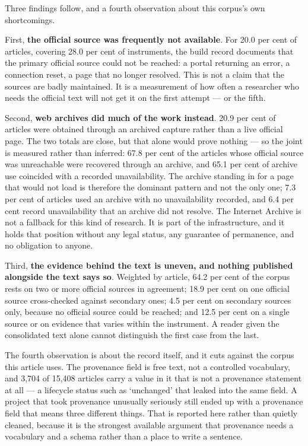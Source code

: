 \documentclass[11pt]{article}
\begin{document}
Three findings follow, and a fourth observation about this corpus's own
shortcomings.

First, \textbf{the official source was frequently not available}. For 20.0 per
cent of articles, covering 28.0 per cent of instruments, the build record
documents that the primary official source could not be reached: a portal
returning an error, a connection reset, a page that no longer resolved. This
is not a claim that the sources are badly maintained. It is a measurement of
how often a researcher who needs the official text will not get it on the
first attempt --- or the fifth.

Second, \textbf{web archives did much of the work instead}. 20.9 per cent of
articles were obtained through an archived capture rather than a live official
page. The two totals are close, but that alone would prove nothing --- so the
joint is measured rather than inferred: 67.8 per cent of the articles whose
official source was unreachable were recovered through an archive, and 65.1 per
cent of archive use coincided with a recorded unavailability. The archive
standing in for a page that would not load is therefore the dominant pattern
and not the only one; 7.3 per cent of articles used an archive with no
unavailability recorded, and 6.4 per cent record unavailability that an archive
did not resolve. The Internet Archive is not a fallback for this kind of
research. It is part of the infrastructure, and it holds that position without
any legal status, any guarantee of permanence, and no obligation to anyone.

Third, \textbf{the evidence behind the text is uneven, and nothing published
alongside the text says so}. Weighted by article, 64.2 per cent of the corpus
rests on two or more official sources in agreement; 18.9 per cent on one
official source cross-checked against secondary ones; 4.5 per cent on secondary
sources only, because no official source could be reached; and 12.5 per cent on
a single source or on evidence that varies within the instrument. A reader
given the consolidated text alone cannot distinguish the first case from the
last.

The fourth observation is about the record itself, and it cuts against the
corpus this article uses. The provenance field is free text, not a controlled
vocabulary, and 3,704 of 15,408 articles carry a value in it that is not a
provenance statement at all --- a lifecycle status such as `unchanged' that
leaked into the same field. A project that took provenance unusually seriously
still ended up with a provenance field that means three different things. That
is reported here rather than quietly cleaned, because it is the strongest
available argument that provenance needs a vocabulary and a schema rather than
a place to write a sentence.
\end{document}
